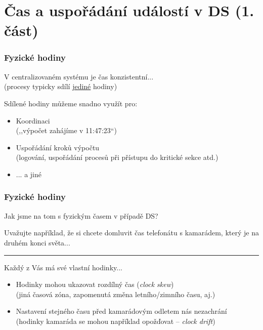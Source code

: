 \documentclass[usenames,dvipsnames,9pt]{beamer}
\begin{document}
\section{Čas a uspořádání událostí v DS  (1. část)}

\begin{frame}
  \frametitle{Fyzické hodiny}


  {\LARGE V centralizovaném systému je čas konzistentní...} \\
  {\large (procesy typicky sdílí \underline{jediné} hodiny)}

  \vspace{1em}

  Sdílené hodiny můžeme snadno využít pro:
  \begin{itemize}
    \item Koordinaci \\
          {\small (,,výpočet zahájíme v 11:47:23``)}
    \item Uspořádání kroků výpočtu \\
          {\small (logování, uspořádání procesů při přístupu do kritické sekce atd.)}
    \item ... a jiné
  \end{itemize}

\end{frame}

\begin{frame}
  \frametitle{Fyzické hodiny}

  \begin{center}
    \LARGE Jak jsme na tom s fyzickým časem v případě DS?
  \end{center}
  Uvažujte například, že si chcete domluvit čas telefonátu s kamarádem, který je na druhém konci světa...

  \vspace{1em}\hrule\vspace{1em}

  \pause
  Každý z Vás má své vlastní hodinky...
  \begin{itemize}
  	\pause\item Hodinky mohou ukazovat rozdílný čas (\emph{clock skew}) \\
  	            {\small (jiná časová zóna, zapomenutá změna letního/zimního času, aj.)}
  	\pause\item Nastavení stejného času před kamarádovým odletem nás nezachrání \\
  				{\small (hodinky kamaráda se mohou například opožďovat -- \emph{clock drift})}
  \end{itemize}

\end{frame}
\end{document}

